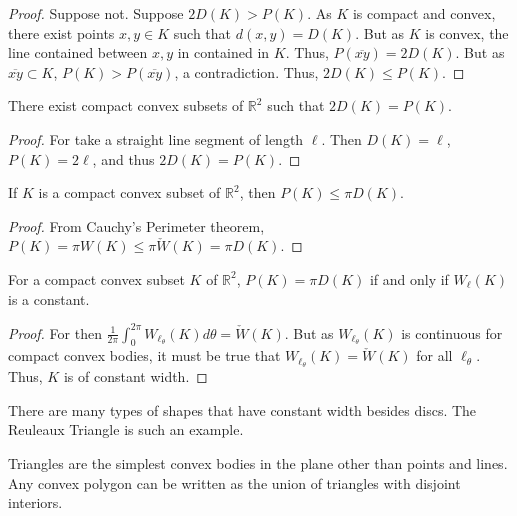 \documentclass[crop=false,class=book,oneside]{standalone}
\begin{document}
            \begin{proof}
            Suppose not. Suppose $2D(K) >P(K)$. As $K$ is compact and convex, there exist points $x,y\in K$ such that $d(x,y) = D(K)$. But as $K$ is convex, the line contained between $x,y$ in contained in $K$. Thus, $P(\overline{xy}) = 2D(K)$. But as $\overline{xy}\subset K$, $P(K)>P(\overline{xy})$, a contradiction. Thus, $2D(K) \leq P(K)$.
            \end{proof}
            \begin{theorem}
            There exist compact convex subsets of $\mathbb{R}^2$ such that $2D(K) = P(K)$.
            \end{theorem}
            \begin{proof}
            For take a straight line segment of length $\ell$. Then $D(K) = \ell$, $P(K) = 2\ell$, and thus $2D(K) = P(K)$.
            \end{proof}
            \begin{theorem}
            If $K$ is a compact convex subset of $\mathbb{R}^2$, then $P(K) \leq \pi D(K)$.
            \end{theorem}
            \begin{proof}
            From Cauchy's Perimeter theorem, $P(K) = \pi W(K) \leq \pi \check{W}(K) = \pi D(K)$.
            \end{proof}
            \begin{theorem}
            For a compact convex subset $K$ of $\mathbb{R}^2$, $P(K) = \pi D(K)$ if and only if $W_{\ell}(K)$ is a constant.
            \end{theorem}
            \begin{proof}
            For then $\frac{1}{2\pi} \int_{0}^{2\pi} W_{\ell_{\theta}}(K) d\theta = \check{W}(K)$. But as $W_{\ell_{\theta}}(K)$ is continuous for compact convex bodies, it must be true that $W_{\ell_{\theta}}(K) = \check{W}(K)$ for all $\ell_{\theta}$. Thus, $K$ is of constant width.
            \end{proof}
            \begin{remark}
            There are many types of shapes that have constant width besides discs. The Reuleaux Triangle is such an example.
            \end{remark}
            Triangles are the simplest convex bodies in the plane other than points and lines. Any convex polygon can be written as the union of triangles with disjoint interiors. 
\end{document}
